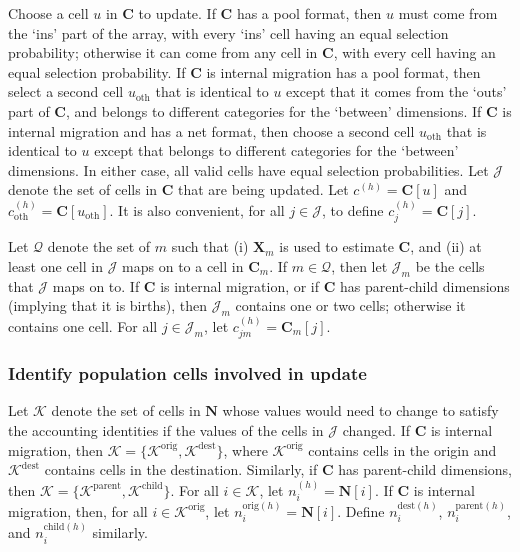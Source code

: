 \documentclass{article}
\begin{document}
Choose a cell $u$ in $\bm{C}$ to update.  If $\bm{C}$ has a pool format, then $u$ must come from the `ins' part of the array, with every `ins' cell having an equal selection probability; otherwise it can come from any cell in $\bm{C}$, with every cell having an equal selection probability.  If $\bm{C}$ is internal migration has a pool format, then select a second cell $u_{\text{oth}}$ that is identical to $u$ except that it comes from the `outs' part of $\bm{C}$, and belongs to different categories for the `between' dimensions.  If $\bm{C}$ is internal migration and has a net format, then choose a second cell $u_{\text{oth}}$ that is identical to $u$ except that belongs to different categories for the `between' dimensions.  In either case, all valid cells have equal selection probabilities.  Let $\mathcal{J}$ denote the set of cells in $\bm{C}$ that are being updated. Let $c^{(h)} = \bm{C}[u]$ and $c_{\text{oth}}^{(h)} = \bm{C}[u_{\text{oth}}]$. It is also convenient, for all $j \in \mathcal{J}$, to define $c_j^{(h)} = \bm{C}[j]$.

Let $\mathcal{Q}$ denote the set of $m$ such that (i) $\bm{X}_m$ is used to estimate $\bm{C}$, and (ii) at least one cell in $\mathcal{J}$ maps on to a cell in $\bm{C}_m$.  If $m \in \mathcal{Q}$, then let $\mathcal{J}_m$ be the cells that $\mathcal{J}$ maps on to.  If $\bm{C}$ is internal migration, or if $\bm{C}$ has parent-child dimensions (implying that it is births), then $\mathcal{J}_m$ contains one or two cells; otherwise it contains one cell.  For all $j \in \mathcal{J}_m$, let $c_{jm}^{(h)} = \bm{C}_m[j]$.

\subsubsection{Identify population cells involved in update}

Let $\mathcal{K}$ denote the set of cells in $\bm{N}$ whose values would need to change to satisfy the accounting identities if the values of the cells in $\mathcal{J}$ changed.  If $\bm{C}$ is internal migration, then $\mathcal{K} = \{\mathcal{K}^{\text{orig}}, \mathcal{K}^{\text{dest}}\}$, where $\mathcal{K}^{\text{orig}}$ contains cells in the origin and $\mathcal{K}^{\text{dest}}$ contains cells in the destination.  Similarly, if $\bm{C}$ has parent-child dimensions, then $\mathcal{K} = \{\mathcal{K}^{\text{parent}}, \mathcal{K}^{\text{child}}\}$. For all $i \in \mathcal{K}$, let $n_i^{(h)} = \bm{N}[i]$.  If $\bm{C}$ is internal migration, then, for all $i \in \mathcal{K}^{\text{orig}}$, let $n_i^{\text{orig}(h)} = \bm{N}[i]$.  Define $n_i^{\text{dest}(h)}$, $n_i^{\text{parent}(h)}$, and $n_i^{\text{child}(h)}$ similarly.
\end{document}
